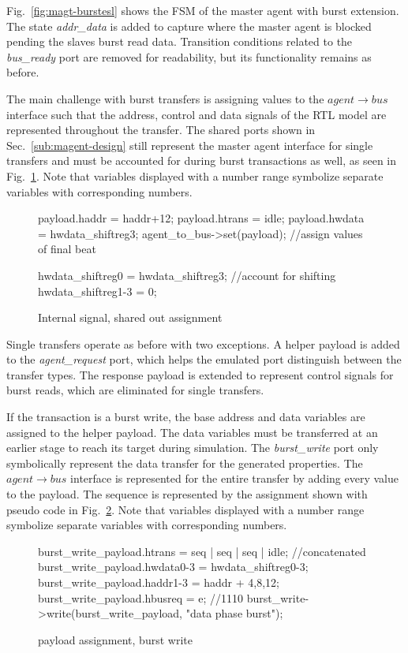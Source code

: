Fig.~\ref{fig:magt-burstesl} shows the FSM of the master agent with burst extension. The state \textit{addr\_data} is added to capture where the master agent is blocked pending the slaves burst read data. Transition conditions related to the \textit{bus\_ready} port are removed for readability, but its functionality remains as before. \par
The main challenge with burst transfers is assigning values to the $agent\rightarrow bus$ interface such that the address, control and data signals of the RTL model are represented throughout the transfer. The shared ports shown in Sec.~\ref{sub:magent-design} still represent the master agent interface for single transfers and must be accounted for during burst transactions as well, as seen in Fig.~\ref{fig:var-assign}. Note that variables displayed with a number range symbolize separate variables with corresponding numbers.
\newpage
\begin{figure}[h!]
\begin{C++}
payload.haddr = haddr+12;
payload.htrans = idle;
payload.hwdata = hwdata_shiftreg3;
agent_to_bus->set(payload); //assign values of final beat 

hwdata_shiftreg0 = hwdata_shiftreg3; //account for shifting
hwdata_shiftreg1-3 = 0;
\end{C++}
\caption{Internal signal, shared out assignment}
\label{fig:var-assign}
\end{figure} 


Single transfers operate as before with two exceptions. A helper payload is added to the \textit{agent\_request} port, which helps the emulated port distinguish between the transfer types. The response payload is extended to represent control signals for burst reads, which are eliminated for single transfers. \par
If the transaction is a burst write, the base address and data variables are assigned to the helper payload. The data variables must be transferred at an earlier stage to reach its target during simulation. The \textit{burst\_write} port only symbolically represent the data transfer for the generated properties. The $agent\rightarrow bus$ interface is represented for the entire transfer by adding every value to the payload. The sequence is represented by the assignment shown with pseudo code in Fig.~\ref{fig:burst-write-sequence}. Note that variables displayed with a number range symbolize separate variables with corresponding numbers.        

\begin{figure}[h!]
\begin{C++}
burst_write_payload.htrans = seq | seq | seq | idle; //concatenated
burst_write_payload.hwdata0-3 = hwdata_shiftreg0-3;
burst_write_payload.haddr1-3 = haddr + 4,8,12; 
burst_write_payload.hbusreq = e; //1110
burst_write->write(burst_write_payload, "data phase burst");
\end{C++}
\caption{payload assignment, burst write}
\label{fig:burst-write-sequence}
\end{figure}


